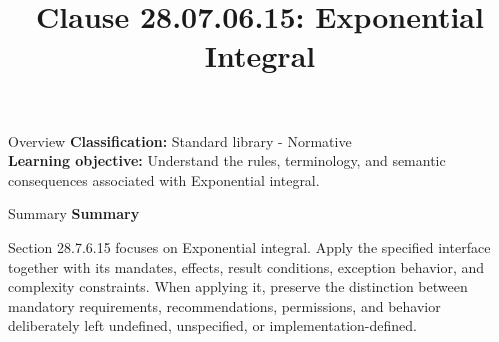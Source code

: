 \documentclass[10pt,letterpaper]{article}
\title{Clause 28.07.06.15: Exponential Integral}
\author{}
\date{}
\begin{document}
\maketitle
\begin{CornellOverviewBox}{Overview}
\textbf{Classification:} Standard library - Normative\\[2pt]
\textbf{Learning objective:} Understand the rules, terminology, and semantic consequences associated with Exponential integral.
\end{CornellOverviewBox}\begin{CornellSummaryBox}{Summary}
{\sffamily\bfseries\color{Accent} Summary}\par\vspace{3pt}Section 28.7.6.15 focuses on Exponential integral. Apply the specified interface together with its mandates, effects, result conditions, exception behavior, and complexity constraints. When applying it, preserve the distinction between mandatory requirements, recommendations, permissions, and behavior deliberately left undefined, unspecified, or implementation-defined.
\end{CornellSummaryBox}
\end{document}
